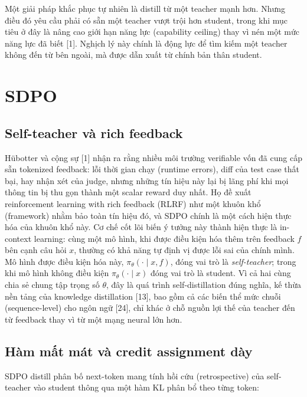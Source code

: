 Một giải pháp khắc phục tự nhiên là distill từ một teacher mạnh hơn. Nhưng điều đó yêu cầu phải có sẵn một teacher vượt trội hơn student, trong khi mục tiêu ở đây là nâng cao giới hạn năng lực (capability ceiling) thay vì nén một mức năng lực đã biết {[}1{]}. Nghịch lý này chính là động lực để tìm kiếm một teacher không đến từ bên ngoài, mà được dẫn xuất từ chính bản thân student.

\section{SDPO}\label{sdpo}

\subsection{Self-teacher và rich feedback}\label{the-self-teacher-and-rich-feedback}

Hübotter và cộng sự {[}1{]} nhận ra rằng nhiều môi trường verifiable vốn đã cung cấp sẵn tokenized feedback: lỗi thời gian chạy (runtime errors), diff của test case thất bại, hay nhận xét của judge, nhưng những tín hiệu này lại bị lãng phí khi mọi thông tin bị thu gọn thành một scalar reward duy nhất. Họ đề xuất reinforcement learning with rich feedback (RLRF) như một khuôn khổ (framework) nhằm bảo toàn tín hiệu đó, và SDPO chính là một cách hiện thực hóa của khuôn khổ này. Cơ chế cốt lõi biến ý tưởng này thành hiện thực là in-context learning: cùng một mô hình, khi được điều kiện hóa thêm trên feedback \(f\) bên cạnh câu hỏi \(x\), thường có khả năng tự định vị được lỗi sai của chính mình. Mô hình được điều kiện hóa này, \(\pi_\theta(\cdot \mid x, f)\), đóng vai trò là \emph{self-teacher}; trong khi mô hình không điều kiện \(\pi_\theta(\cdot \mid x)\) đóng vai trò là student. Vì cả hai cùng chia sẻ chung tập trọng số \(\theta\), đây là quá trình self-distillation đúng nghĩa, kế thừa nền tảng của knowledge distillation {[}13{]}, bao gồm cả các biến thể mức chuỗi (sequence-level) cho ngôn ngữ {[}24{]}, chỉ khác ở chỗ nguồn lợi thế của teacher đến từ feedback thay vì từ một mạng neural lớn hơn.

\subsection{Hàm mất mát và credit assignment dày}\label{the-loss-and-dense-credit-assignment}

SDPO distill phân bố next-token mang tính hồi cứu (retrospective) của self-teacher vào student thông qua một hàm KL phân bổ theo từng token:

